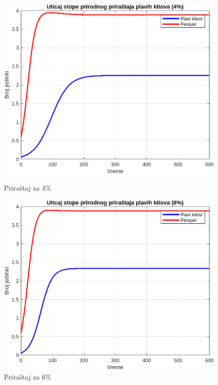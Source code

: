 \documentclass[a4paper]{article}
\begin{document}
{	\begin{figure}[h]
		\centering
		\begin{minipage}[h]{0.45\linewidth}
			\centering
			\includegraphics[width=\textwidth]{uticaj4.png}
			\caption{Priraštaj za 4\%}
			\label{slika1: pp4}
		\end{minipage}
		\hspace{0.5cm} 
		\begin{minipage}[h]{0.45\linewidth}
			\centering
			\includegraphics[width=\textwidth]{uticaj6.png} 
			\caption{Priraštaj za 6\%} 
			\label{slika2: pp6}
		\end{minipage}
	\end{figure}

}
\end{document}
